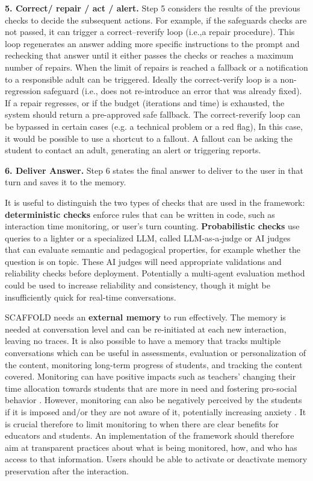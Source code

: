 \documentclass[fleqn,10pt]{wlscirep}
\begin{document}
\textbf{5. Correct/ repair / act / alert.} Step 5 considers the results of the previous checks to decide the subsequent actions. For example, if the safeguards checks are not passed, it can trigger a correct--reverify loop (i.e.,a repair procedure). This loop regenerates an answer adding more specific instructions to the prompt and rechecking that answer until it either passes the checks or reaches a maximum number of repairs. When the limit of repairs is reached a fallback or a notification to a responsible adult can be triggered. Ideally the correct-verify loop is a non-regression safeguard (i.e., does not re-introduce an error that was already fixed). If a repair regresses, or if the budget (iterations and time) is exhausted, the system should return a pre-approved safe fallback. The correct-reverify loop can be bypassed in certain cases (e.g. a technical problem or a red flag), In this case, it would be possible to use a shortcut to a fallout. A fallout can be asking the student to contact an adult, generating an alert or triggering reports.

\textbf{6. Deliver Answer.} Step 6 states the final answer to deliver to the user in that turn and saves it to the memory.

It is useful to distinguish the two types of checks that are used in the framework: \textbf{deterministic checks} enforce rules that can be written in code, such as interaction time monitoring, or user's turn counting. \textbf{Probabilistic checks} use queries to a lighter or a specialized LLM, called LLM‑as‑a‑judge or AI judges \cite{Baysan2025, Gu2026} that can evaluate semantic and pedagogical properties, for example whether the question is on topic. These AI judges will need appropriate validations and reliability checks before deployment. Potentially a multi-agent evaluation method could be used to increase reliability and consistency, though it might be insufficiently quick for real-time conversations.

SCAFFOLD needs an \textbf{external memory} to run effectively. The memory is needed at conversation level and can be re-initiated at each new interaction, leaving no traces. It is also possible to have a memory that tracks multiple conversations which can be useful in assessments, evaluation or personalization of the content, monitoring long-term progress of students, and tracking the content covered. Monitoring can have positive impacts such as teachers' changing their time allocation towards students that are more in need \cite{Holstein2018} and fostering pro-social behavior \cite{Canigueral2019}. However, monitoring can also be negatively perceived by the students if it is imposed and/or they are not aware of it, potentially increasing anxiety \cite{Canigueral2019}. It is crucial therefore to limit monitoring to when there are clear benefits for educators and students. An implementation of the framework should therefore aim at transparent practices about what is being monitored, how, and who has access to that information. Users should be able to activate or deactivate memory preservation after the interaction.
\end{document}
